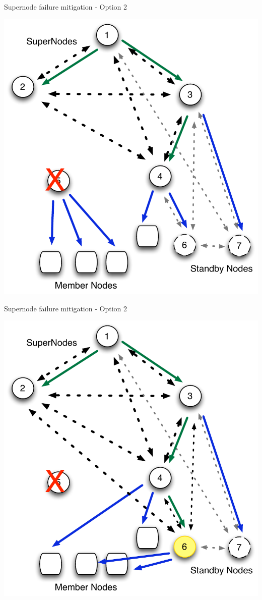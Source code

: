 \documentclass{beamer}
\begin{document}
\begin{frame}{Supernode failure mitigation - Option 2}

\includegraphics[scale=.5]{Node-comm-trans1.pdf}


\end{frame}


\begin{frame}{Supernode failure mitigation - Option 2}

\includegraphics[scale=.5]{Node-comm-redist2.pdf}


\end{frame}
\end{document}
